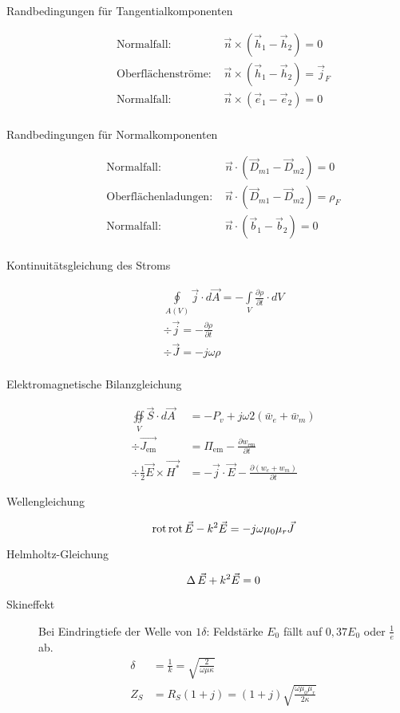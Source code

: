 \begin{description}
\item[Randbedingungen für Tangentialkomponenten]
\begin{align*}
\text{Normalfall: }&\vec{n}\times\left(\vec{h}_1 - \vec{h}_2 \right) = 0 \\
\text{Oberflächenströme: }&\vec{n}\times\left(\vec{h}_1 - \vec{h}_2 \right) = \vec{j}_F \\
\text{Normalfall: }&\vec{n}\times\left(\vec{e}_1 - \vec{e}_2 \right) = 0 \\
\end{align*}

\item[Randbedingungen für Normalkomponenten]
\begin{align*}
\text{Normalfall: }&\vec{n}\cdot\left(\vec{D}_{m1} - \vec{D}_{m2} \right) = 0 \\
\text{Oberflächenladungen: }&\vec{n}\cdot\left(\vec{D}_{m1} - \vec{D}_{m2} \right) = \rho_F \\
\text{Normalfall: }&\vec{n}\cdot\left(\vec{b}_1 - \vec{b}_2 \right) = 0 \\
\end{align*}

\item[Kontinuitätsgleichung des Stroms]
\begin{align*}
\oint\limits_{A(V)} \vec{j} \cdot d\vec{A} = - \int\limits_V \frac{\partial \rho}{\partial t} \cdot dV \\
\div{\vec{j}} = - \frac{\partial \rho}{\partial t} \\
\div{\vec{J}} = - j \omega \rho \\
\end{align*}

\item[Elektromagnetische Bilanzgleichung]
\begin{align*}
\oiint\limits_V \vec{S} \cdot d\vec{A} &= -P_v + j\omega 2(\bar{w}_e + \bar{w}_m) \\
\div{\vec{J_\text{em}}} &= \Pi_\text{em} - \frac{\partial w_\text{em}}{\partial t} \\
\div{\frac{1}{2}\vec{E}\times\vec{H^*}} &= -\vec{j}\cdot\vec{E} - \frac{\partial(w_e + w_m)}{\partial t}
\end{align*}

\item[Wellengleichung]
\begin{equation*}
\text{rot}\, \text{rot}\, \vec{E} - k^2\vec{E} = -j \omega \mu_0 \mu_r \vec{J}
\end{equation*}

\item[Helmholtz-Gleichung]
\begin{equation*}
\Delta\, \vec{E} + k^2 \vec{E} = 0
\end{equation*}

\item[Skineffekt] Bei Eindringtiefe der Welle von $1\delta$: Feldstärke $E_0$ fällt auf $0,37 E_0$ oder $\frac{1}{e}$ ab.
\begin{align*}
\delta &= \frac{1}{k} = \sqrt{\frac{2}{\omega \mu \kappa}} \\
Z_S &= R_S(1+j) = (1+j) \sqrt{\frac{\omega \mu_0 \mu_r}{2 \kappa}}
\end{align*}
\end{description}